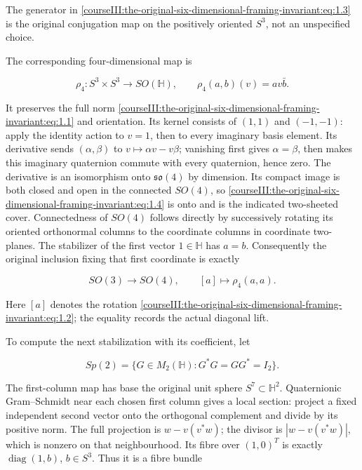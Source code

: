 The generator in \eqref{courseIII:the-original-six-dimensional-framing-invariant:eq:1.3} is the original conjugation map on the positively oriented \(S^3\), not an unspecified choice.

The corresponding four-dimensional map is

\begin{equation}
\rho_4:S^3\times S^3\longrightarrow SO(\mathbb H),
 \qquad \rho_4(a,b)(v)=av\bar b.
 \label{courseIII:the-original-six-dimensional-framing-invariant:eq:1.4}
\end{equation}

It preserves the full norm \eqref{courseIII:the-original-six-dimensional-framing-invariant:eq:1.1} and orientation. Its kernel consists of \((1,1)\) and \((-1,-1)\): apply the identity action to \(v=1\), then to every imaginary basis element. Its derivative sends \((\alpha,\beta)\) to \(v\mapsto\alpha v-v\beta\); vanishing first gives \(\alpha=\beta\), then makes this imaginary quaternion commute with every quaternion, hence zero. The derivative is an isomorphism onto \(\mathfrak{so}(4)\) by dimension. Its compact image is both closed and open in the connected \(SO(4)\), so \eqref{courseIII:the-original-six-dimensional-framing-invariant:eq:1.4} is onto and is the indicated two-sheeted cover. Connectedness of \(SO(4)\) follows directly by successively rotating its oriented orthonormal columns to the coordinate columns in coordinate two-planes. The stabilizer of the first vector \(1\in\mathbb H\) has \(a=b\). Consequently the original inclusion fixing that first coordinate is exactly

\begin{equation}
SO(3)\longrightarrow SO(4),\qquad
 [a]\longmapsto\rho_4(a,a).
 \label{courseIII:the-original-six-dimensional-framing-invariant:eq:1.5}
\end{equation}

Here \([a]\) denotes the rotation \eqref{courseIII:the-original-six-dimensional-framing-invariant:eq:1.2}; the equality records the actual diagonal lift.

To compute the next stabilization with its coefficient, let

\begin{equation}
Sp(2)=\{G\in M_2(\mathbb H):G^*G=GG^*=I_2\}.
 \label{courseIII:the-original-six-dimensional-framing-invariant:eq:1.6}
\end{equation}

The first-column map has base the original unit sphere \(S^7\subset\mathbb H^2\). Quaternionic Gram--Schmidt near each chosen first column gives a local section: project a fixed independent second vector onto the orthogonal complement and divide by its positive norm. The full projection is \(w-v(v^*w)\); the divisor is \(|w-v(v^*w)|\), which is nonzero on that neighbourhood. Its fibre over \((1,0)^T\) is exactly \(\operatorname{diag}(1,b)\), \(b\in S^3\). Thus it is a fibre bundle

